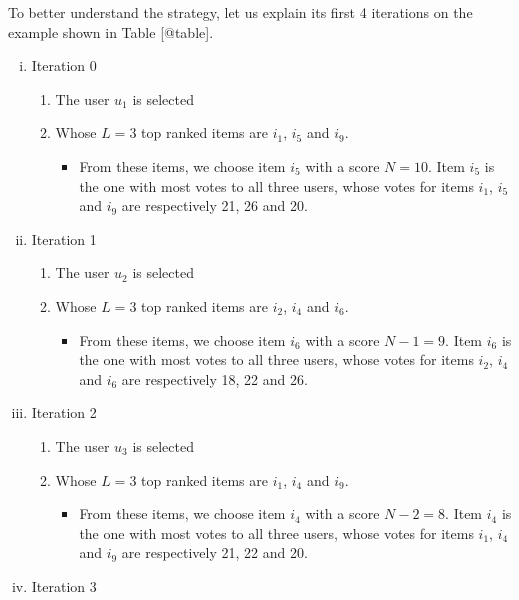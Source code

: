 \documentclass[]{article}
\begin{document}
To better understand the strategy, let us explain its first 4 iterations
on the example shown in Table {[}@table{]}.

\begin{enumerate}[i.]
\item
  Iteration 0

  \begin{enumerate}[1.]
  \item
    The user $u_{1}$ is selected
  \item
    Whose $L=3$ top ranked items are $i_{1}$, $i_{5}$ and $i_{9}$.

    \begin{itemize}
    \item
      From these items, we choose item $i_{5}$ with a score $N=10$. Item
      $i_{5}$ is the one with most votes to all three users, whose votes
      for items $i_{1}$, $i_{5}$ and $i_{9}$ are respectively 21, 26 and
      20.
    \end{itemize}
  \end{enumerate}
\item
  Iteration 1

  \begin{enumerate}[1.]
  \item
    The user $u_{2}$ is selected
  \item
    Whose $L=3$ top ranked items are $i_{2}$, $i_{4}$ and $i_{6}$.

    \begin{itemize}
    \item
      From these items, we choose item $i_{6}$ with a score $N-1=9$.
      Item $i_{6}$ is the one with most votes to all three users, whose
      votes for items $i_{2}$, $i_{4}$ and $i_{6}$ are respectively 18,
      22 and 26.
    \end{itemize}
  \end{enumerate}
\item
  Iteration 2

  \begin{enumerate}[1.]
  \item
    The user $u_{3}$ is selected
  \item
    Whose $L=3$ top ranked items are $i_{1}$, $i_{4}$ and $i_{9}$.

    \begin{itemize}
    \item
      From these items, we choose item $i_{4}$ with a score $N-2=8$.
      Item $i_{4}$ is the one with most votes to all three users, whose
      votes for items $i_{1}$, $i_{4}$ and $i_{9}$ are respectively 21,
      22 and 20.
    \end{itemize}
  \end{enumerate}
\item
  Iteration 3


\end{enumerate}
\end{document}
